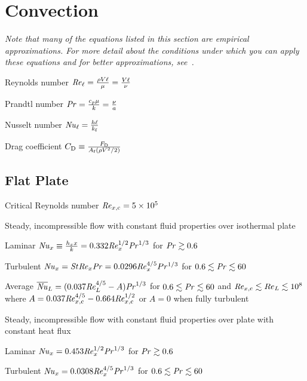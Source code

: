 \documentclass{article}
\begin{document}
\section{Convection}
\label{sec:convection}

\emph{Note that many of the equations listed in this section are empirical approximations. For more
  detail about the conditions under which you can apply these equations and for better
  approximations, see~\cite{hamt}.}

\begin{description*}
\item[Reynolds number]
  \(\mathord{\mathit{Re}}_\ell = \frac{\rho{}V\ell}{\mu} = \frac{V\ell}{\nu}\)
\item[Prandtl number]
  \(\mathord{\mathit{Pr}} = \frac{c_p\mu}{k} = \frac{\nu}{a}\)
\item[Nusselt number]
  \(\mathord{\mathit{Nu}}_\ell = \frac{h\ell}{k_{\mathrm{f}}}\)
\item[Drag coefficient]
  \(C_{\mathrm{D}} \equiv \frac{F_{\mathrm{D}}}{A_{\mathrm{f}}(\rho V^2/2)}\)
\end{description*}

\subsection{Flat Plate}
\begin{description*}
\item[Critical Reynolds number]
  \(\mathord{\mathit{Re}}_{x,\mathrm{c}} = \num{5e5}\)
\item[Steady, incompressible flow with constant fluid properties over isothermal plate]~
  \begin{description*}
  \item[Laminar]
    \(\mathord{\mathit{Nu}}_x \equiv \frac{h_x x}{k} = 0.332\mathord{\mathit{Re}}_x^{1/2}\mathord{\mathit{Pr}}^{1/3}\) for
    \(\mathord{\mathit{Pr}} \gtrsim 0.6\)
  \item[Turbulent]
    \(\mathord{\mathit{Nu}}_x = \mathord{\mathit{St}}\mathord{\mathit{Re}}_x\mathord{\mathit{Pr}} = 0.0296\mathord{\mathit{Re}}_x^{4/5}Pr^{1/3}\) for
    \(0.6 \lesssim \mathord{\mathit{Pr}} \lesssim 60\)
  \item[Average]
    \(\overline{\mathord{\mathit{Nu}}}_L = (0.037\mathord{\mathit{Re}}_L^{4/5} - A)\mathord{\mathit{Pr}}^{1/3}\) for
    \(0.6 \lesssim \mathord{\mathit{Pr}} \lesssim 60\) and
    \(\mathord{\mathit{Re}}_{x,\mathrm{c}} \lesssim Re_L \lesssim 10^8\) \\
    where \(A = 0.037\mathord{\mathit{Re}}_{x,\mathrm{c}}^{4/5} - 0.664\mathord{\mathit{Re}}_{x,\mathrm{c}}^{1/2}\)
    or \(A = 0\) when fully turbulent
  \end{description*}
\item[Steady, incompressible flow with constant fluid properties over plate with constant heat flux]~
  \begin{description*}
  \item[Laminar]
    \(\mathord{\mathit{Nu}}_x = 0.453\mathord{\mathit{Re}}_x^{1/2}\mathord{\mathit{Pr}}^{1/3}\) for \(\mathord{\mathit{Pr}} \gtrsim 0.6\)
  \item[Turbulent]
    \(\mathord{\mathit{Nu}}_x = 0.0308\mathord{\mathit{Re}}_x^{4/5}\mathord{\mathit{Pr}}^{1/3}\) for \(0.6 \lesssim \mathord{\mathit{Pr}} \lesssim 60\)
  \end{description*}
\end{description*}
\end{document}
